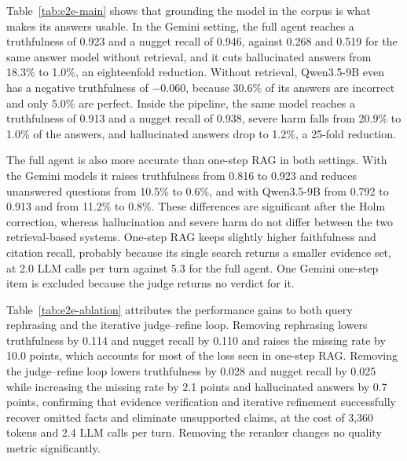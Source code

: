 

Table~\ref{tab:e2e-main} shows that grounding the model in the corpus is what makes its answers usable. In the Gemini setting, the full agent reaches a truthfulness of 0.923 and a nugget recall of 0.946, against 0.268 and 0.519 for the same answer model without retrieval, and it cuts hallucinated answers from 18.3\% to 1.0\%, an eighteenfold reduction. Without retrieval, Qwen3.5-9B even has a negative truthfulness of $-0.060$, because 30.6\% of its answers are incorrect and only 5.0\% are perfect. Inside the pipeline, the same model reaches a truthfulness of 0.913 and a nugget recall of 0.938, severe harm falls from 20.9\% to 1.0\% of the answers, and hallucinated answers drop to 1.2\%, a 25-fold reduction.

The full agent is also more accurate than one-step RAG in both settings. With the Gemini models it raises truthfulness from 0.816 to 0.923 and reduces unanswered questions from 10.5\% to 0.6\%, and with Qwen3.5-9B from 0.792 to 0.913 and from 11.2\% to 0.8\%. These differences are significant after the Holm correction, whereas hallucination and severe harm do not differ between the two retrieval-based systems. One-step RAG keeps slightly higher faithfulness and citation recall, probably because its single search returns a smaller evidence set, at 2.0 LLM calls per turn against 5.3 for the full agent. One Gemini one-step item is excluded because the judge returns no verdict for it.




Table~\ref{tab:e2e-ablation} attributes the performance gains to both query rephrasing and the iterative judge--refine loop. Removing rephrasing lowers truthfulness by 0.114 and nugget recall by 0.110 and raises the missing rate by 10.0 points, which accounts for most of the loss seen in one-step RAG. Removing the judge--refine loop lowers truthfulness by 0.028 and nugget recall by 0.025 while increasing the missing rate by 2.1 points and hallucinated answers by 0.7 points, confirming that evidence verification and iterative refinement successfully recover omitted facts and eliminate unsupported claims, at the cost of 3{,}360 tokens and 2.4 LLM calls per turn. Removing the reranker changes no quality metric significantly.

